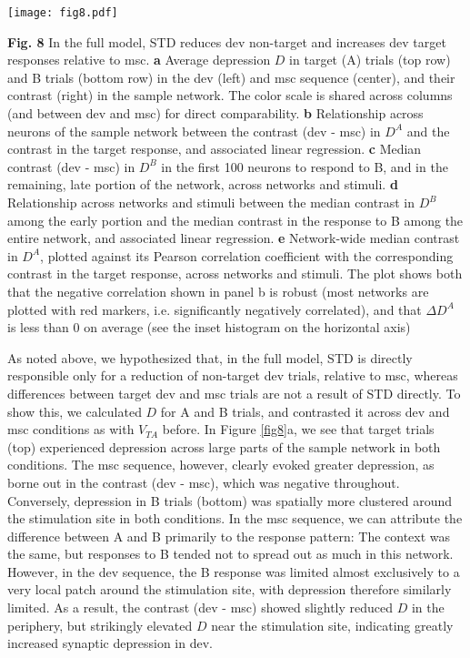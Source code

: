 \documentclass[pdflatex,referee,iicol,sn-basic]{sn-jnl}
\theoremstyle{thmstyleone}%
\theoremstyle{thmstyletwo}%
\theoremstyle{thmstylethree}%
\begin{document}
\begin{figure*}%
    \centering
    \texttt{[image: fig8.pdf]}
    \caption{}
    \label{fig8}
\end{figure*}
\textbf{Fig. 8} In the full model, STD reduces dev non-target and increases dev target responses relative to msc.
\textbf{a} Average depression $D$ in target (A) trials (top row) and B trials (bottom row) in the dev (left) and msc sequence (center), and their contrast (right) in the sample network. The color scale is shared across columns (and between dev and msc) for direct comparability.
\textbf{b} Relationship across neurons of the sample network between the contrast (dev - msc) in $D^A$ and the contrast in the target response, and associated linear regression.
\textbf{c} Median contrast (dev - msc) in $D^B$ in the first 100 neurons to respond to B, and in the remaining, late portion of the network, across networks and stimuli.
\textbf{d} Relationship across networks and stimuli between the median contrast in $D^B$ among the early portion and the median contrast in the response to B among the entire network, and associated linear regression.
\textbf{e} Network-wide median contrast in $D^A$, plotted against its Pearson correlation coefficient with the corresponding contrast in the target response, across networks and stimuli. The plot shows both that the negative correlation shown in panel b is robust (most networks are plotted with red markers, i.e. significantly negatively correlated), and that $\Delta D^A$ is less than 0 on average (see the inset histogram on the horizontal axis)

As noted above, we hypothesized that, in the full model, STD is directly responsible only for a reduction of non-target dev trials, relative to msc, whereas differences between target dev and msc trials are not a result of STD directly. To show this, we calculated $D$ for A and B trials, and contrasted it across dev and msc conditions as with $V_{TA}$ before.
In Figure \ref{fig8}a, we see that target trials (top) experienced depression across large parts of the sample network in both conditions. The msc sequence, however, clearly evoked greater depression, as borne out in the contrast (dev - msc), which was negative throughout. Conversely, depression in B trials (bottom) was spatially more clustered around the stimulation site in both conditions. In the msc sequence, we can attribute the difference between A and B primarily to the response pattern: The context was the same, but responses to B tended not to spread out as much in this network. However, in the dev sequence, the B response was limited almost exclusively to a very local patch around the stimulation site, with depression therefore similarly limited. As a result, the contrast (dev - msc) showed slightly reduced $D$ in the periphery, but strikingly elevated $D$ near the stimulation site, indicating greatly increased synaptic depression in dev.
\end{document}

